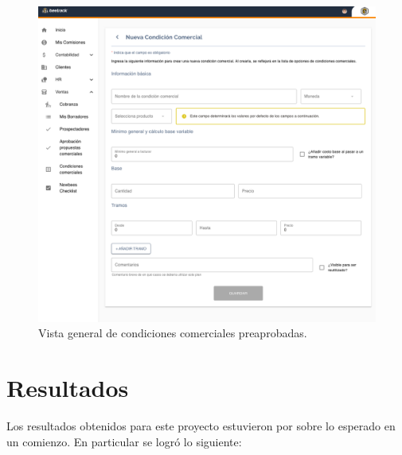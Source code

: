     \begin{figure}[H]
      \centering
      \includegraphics[width=0.6\linewidth]{figures/cc/vistas/cc_new_manager.png}
      \caption{Vista general de condiciones comerciales preaprobadas.}
      \label{fig:cc_new_manager}
    \end{figure}

\section{Resultados}

  Los resultados obtenidos para este proyecto estuvieron por sobre lo esperado en un comienzo. En particular se logró lo siguiente:

